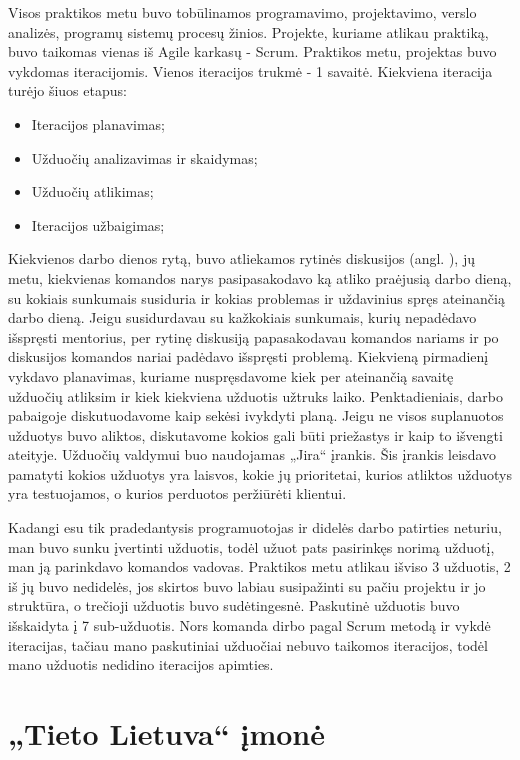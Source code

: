 \documentclass{VUMIFPSbakalaurinis}
\begin{document}
Visos praktikos metu buvo tobūlinamos programavimo, projektavimo, verslo analizės, programų sistemų procesų žinios. Projekte, kuriame atlikau praktiką, buvo taikomas vienas iš Agile karkasų - Scrum. Praktikos metu, projektas buvo vykdomas iteracijomis. Vienos iteracijos trukmė - 1 savaitė. Kiekviena iteracija turėjo šiuos etapus:
\begin{itemize}
    \item Iteracijos planavimas;
    \item Užduočių analizavimas ir skaidymas;
    \item Užduočių atlikimas;
    \item Iteracijos užbaigimas;
\end{itemize}
Kiekvienos darbo dienos rytą, buvo atliekamos rytinės diskusijos (angl. ), jų metu, kiekvienas komandos narys pasipasakodavo ką atliko praėjusią darbo dieną, su kokiais sunkumais susiduria ir kokias problemas ir uždavinius spręs ateinančią darbo dieną. Jeigu susidurdavau su kažkokiais sunkumais, kurių nepadėdavo išspręsti mentorius, per rytinę diskusiją papasakodavau komandos nariams ir po diskusijos komandos nariai padėdavo išspręsti problemą. Kiekvieną pirmadienį vykdavo planavimas, kuriame nuspręsdavome kiek per ateinančią savaitę užduočių atliksim ir kiek kiekviena užduotis užtruks laiko. Penktadieniais, darbo pabaigoje diskutuodavome kaip sekėsi ivykdyti planą. Jeigu ne visos suplanuotos užduotys buvo aliktos, diskutavome kokios gali būti priežastys ir kaip to išvengti ateityje. Užduočių valdymui buo naudojamas „Jira“ įrankis. Šis įrankis leisdavo pamatyti kokios užduotys yra laisvos, kokie jų prioritetai, kurios atliktos užduotys yra testuojamos, o kurios perduotos peržiūrėti klientui.


Kadangi esu tik pradedantysis programuotojas ir didelės darbo patirties neturiu, man buvo sunku įvertinti užduotis, todėl užuot pats pasirinkęs norimą užduotį, man ją parinkdavo komandos vadovas. Praktikos metu atlikau išviso 3 užduotis, 2 iš jų buvo nedidelės, jos skirtos buvo labiau susipažinti su pačiu projektu ir jo struktūra, o trečioji užduotis buvo sudėtingesnė. Paskutinė užduotis buvo išskaidyta į 7 sub-užduotis. Nors komanda dirbo pagal Scrum metodą ir vykdė iteracijas, tačiau mano paskutiniai užduočiai nebuvo taikomos iteracijos, todėl mano užduotis nedidino iteracijos apimties.

\section{„Tieto Lietuva“ įmonė}
\end{document}
